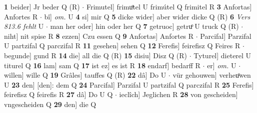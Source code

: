\documentclass[8pt,a4paper,notitlepage]{article}
\begin{document}
\begin{table}[ht]
\begin{minipage}[t]{0.5\linewidth}
\textbf{1} beider] Jr beder Q (R)  $\cdot$ Frimutel] frimuͦtel U frimútel Q frimitel R \textbf{3} Anfortas] Anfortes R  $\cdot$ bî] \textit{om.} U \textbf{4} si] mir Q \textbf{5} dicke wider] aber wider dicke Q (R) \textbf{6} \textit{Vers 813.6 fehlt} U   $\cdot$ man her oder] hin oder her Q \textbf{7} getruoc] getruͦ U truck Q (R)  $\cdot$ niht] nit spise R \textbf{8} ezzen] Czu essen Q \textbf{9} Anfortas] Anfortes R  $\cdot$ Parcifal] Parzifal U partzifal Q parczifal R \textbf{11} gesehen] sehen Q \textbf{12} Ferefis] feirefisz Q Feires R  $\cdot$ begunde] gund R \textbf{14} die] all die Q (R) \textbf{15} disiu] Disz Q (R)  $\cdot$ Tyturel] dieterel U titurel Q \textbf{16} lam] sam Q \textbf{17} ist ez] es ist R \textbf{18} endarf] bedarff R  $\cdot$ er] \textit{om.} U  $\cdot$ willen] wille Q \textbf{19} Grâles] tauffes Q (R) \textbf{22} dâ] Do U  $\cdot$ vür gehouwen] verheuͦwen U \textbf{23} den] [den]: dem Q \textbf{24} Parcifal] Parzifal U partzifal Q parczifal R \textbf{25} Ferefis] feirefisz Q feirefis R \textbf{27} dâ] Do U Q  $\cdot$ ieclîch] Jeglichen R \textbf{28} von gescheiden] vngescheiden Q \textbf{29} den] die Q \newline
\end{minipage}
\end{table}
\end{document}
